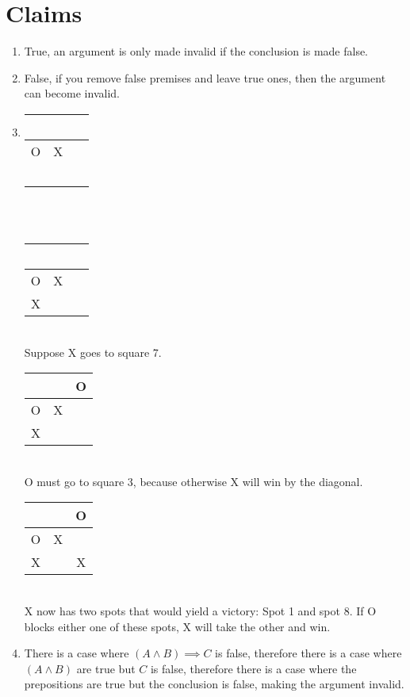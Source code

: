 \documentclass{article}
\begin{document}
	\section{Claims}
	\begin{enumerate}
		\item
			True, an argument is only made invalid if the conclusion is made false.
		\item
			False, if you remove false premises and leave true ones, then the argument can become invalid.
		\item
			\begin{tabular}{c|c|c}
				\ &\ &\ \\ \hline
				O &X &\ \\ \hline 
				\ &\ &\ \\ 
			\end{tabular}\\\\
			\begin{tabular}{c|c|c}
				\ &\ &\ \\ \hline  
				O &X &\ \\ \hline 
				X &\ &\ \\
			\end{tabular}\\	
			Suppose X goes to square 7.\\
			\begin{tabular}{c|c|c}
				\ &\ &O \\ \hline 
				O &X &\ \\ \hline 
				X &\ &\ \\
			\end{tabular}\\	
			O must go to square 3, because otherwise X will win by the diagonal.\\
			\begin{tabular}{c|c|c}
				\ &\ &O \\ \hline 
				O &X &\ \\ \hline 
				X &\ &X \\ 
			\end{tabular}	
			\\X now has two spots that would yield a victory: Spot 1 and spot 8. If O blocks either one of these spots, X will take the other and win.
		\item
			There is a case where $(A\land B)\implies C$ is false, therefore there is a case where $(A \land B)$ are true but $C$ is false, therefore there is a case where the prepositions are true but the conclusion is false, making the argument invalid.\\

\end{enumerate}
\end{document}

